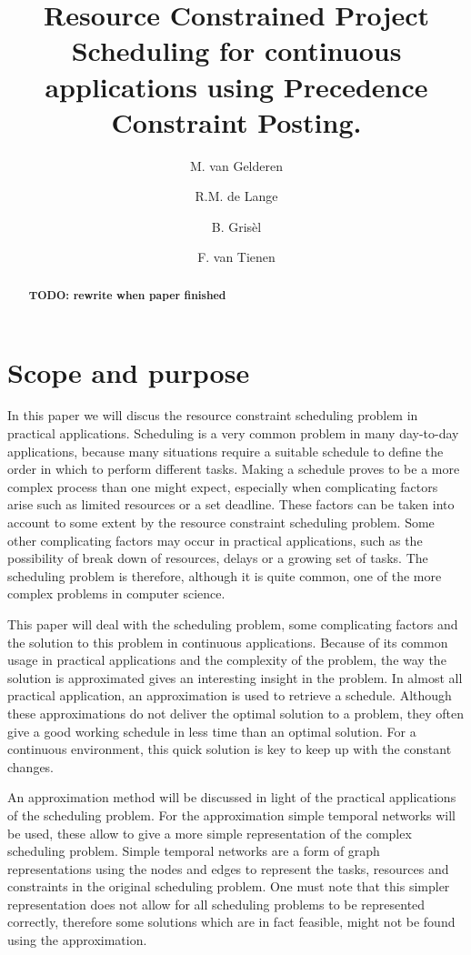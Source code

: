 \documentclass{article}
\title{Resource Constrained Project Scheduling for continuous applications using Precedence Constraint Posting.}
\author{M. van Gelderen  \and
    R.M. de Lange \and
    B. Gris\`el \and
    F. van Tienen}
\date{}
\theoremstyle{definition}
\newcommand{\TODO}[1]{{\color{red}\textbf{TODO: #1}}}
\begin{document}
\maketitle
\thispagestyle{empty}

\begin{abstract}
\TODO{rewrite when paper finished}
\end{abstract}


\newpage


\section{Scope and purpose}

In this paper we will discus the resource constraint scheduling problem in practical applications.
Scheduling is a very common problem in many day-to-day applications, because many situations require a suitable schedule to define the order in which to perform different tasks.
Making a schedule proves to be a more complex process than one might expect, especially when complicating factors arise such as limited resources or a set deadline.
These factors can be taken into account to some extent by the resource constraint scheduling problem.
Some other complicating factors may occur in practical applications, such as the possibility of break down of resources, delays or a growing set of tasks.
The scheduling problem is therefore, although it is quite common, one of the more complex problems in computer science.

This paper will deal with the scheduling problem, some complicating factors and the solution to this problem in continuous applications.
Because of its common usage in practical applications and the complexity of the problem, the way the solution is approximated gives an interesting insight in the problem.
In almost all practical application, an approximation is used to retrieve a schedule.
Although these approximations do not deliver the optimal solution to a problem, they often give a good working schedule in less time than an optimal solution.
For a continuous environment, this quick solution is key to keep up with the constant changes.

An approximation method will be discussed in light of the practical applications of the scheduling problem.
For the approximation simple temporal networks will be used, these allow to give a more simple representation of the complex scheduling problem.
Simple temporal networks are a form of graph representations using the nodes and edges to represent the tasks, resources and constraints in the original scheduling problem.
One must note that this simpler representation does not allow for all scheduling problems to be represented correctly, therefore some solutions which are in fact feasible, might not be found using the approximation.
\end{document}

